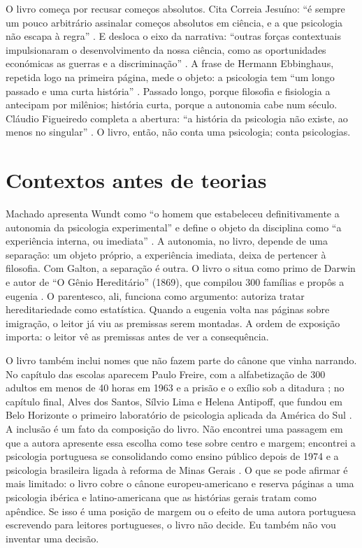 \documentclass[12pt]{article}
\begin{document}
O livro começa por recusar começos absolutos. Cita Correia Jesuíno: ``é sempre um pouco arbitrário assinalar começos absolutos em ciência, e a que psicologia não escapa à regra'' \cite[p. 1]{machado}. E desloca o eixo da narrativa: ``outras forças contextuais impulsionaram o desenvolvimento da nossa ciência, como as oportunidades económicas as guerras e a discriminação'' \cite[p. 1]{machado}. A frase de Hermann Ebbinghaus, repetida logo na primeira página, mede o objeto: a psicologia tem ``um longo passado e uma curta história'' \cite[p. 1]{machado}. Passado longo, porque filosofia e fisiologia a antecipam por milênios; história curta, porque a autonomia cabe num século. Cláudio Figueiredo completa a abertura: ``a história da psicologia não existe, ao menos no singular'' \cite[p. 1]{machado}. O livro, então, não conta uma psicologia; conta psicologias.

\section{Contextos antes de teorias}

Machado apresenta Wundt como ``o homem que estabeleceu definitivamente a autonomia da psicologia experimental'' \cite[p. 10]{machado} e define o objeto da disciplina como ``a experiência interna, ou imediata'' \cite[p. 14]{machado}. A autonomia, no livro, depende de uma separação: um objeto próprio, a experiência imediata, deixa de pertencer à filosofia. Com Galton, a separação é outra. O livro o situa como primo de Darwin e autor de ``O Gênio Hereditário'' (1869), que compilou 300 famílias e propôs a eugenia \cite[pp. 12, 26]{machado}. O parentesco, ali, funciona como argumento: autoriza tratar hereditariedade como estatística. Quando a eugenia volta nas páginas sobre imigração, o leitor já viu as premissas serem montadas. A ordem de exposição importa: o leitor vê as premissas antes de ver a consequência.

O livro também inclui nomes que não fazem parte do cânone que vinha narrando. No capítulo das escolas aparecem Paulo Freire, com a alfabetização de 300 adultos em menos de 40 horas em 1963 e a prisão e o exílio sob a ditadura \cite[p. 78]{machado}; no capítulo final, Alves dos Santos, Sílvio Lima e Helena Antipoff, que fundou em Belo Horizonte o primeiro laboratório de psicologia aplicada da América do Sul \cite[pp. 57, 89]{machado}. A inclusão é um fato da composição do livro. Não encontrei uma passagem em que a autora apresente essa escolha como tese sobre centro e margem; encontrei a psicologia portuguesa se consolidando como ensino público depois de 1974 \cite[p. 57]{machado} e a psicologia brasileira ligada à reforma de Minas Gerais \cite[p. 73]{machado}. O que se pode afirmar é mais limitado: o livro cobre o cânone europeu-americano e reserva páginas a uma psicologia ibérica e latino-americana que as histórias gerais tratam como apêndice. Se isso é uma posição de margem ou o efeito de uma autora portuguesa escrevendo para leitores portugueses, o livro não decide. Eu também não vou inventar uma decisão.
\end{document}
